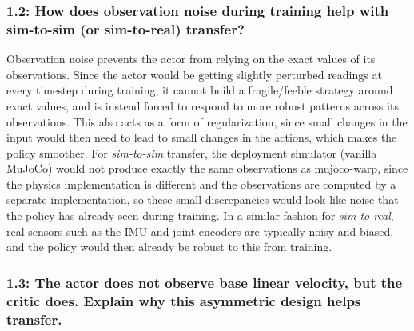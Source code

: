\documentclass[12pt]{article}
\begin{document}
\subsubsection*{1.2: How does observation noise during training help with sim-to-sim (or sim-to-real) transfer?}
\begin{solution}[height=7cm]
Observation noise prevents the actor from relying on the exact values of its observations. Since the actor would be getting slightly perturbed readings at every timestep during training, it cannot build a fragile/feeble strategy around exact values, and is instead forced to respond to more robust patterns across its observations. This also acts as a form of regularization, since small changes in the input would then need to lead to small changes in the actions, which makes the policy smoother. For \emph{sim-to-sim} transfer, the deployment simulator (vanilla MuJoCo) would not produce exactly the same observations as mujoco-warp, since the physics implementation is different and the observations are computed by a separate implementation, so these small discrepancies would look like noise that the policy has already seen during training. In a similar fashion for \emph{sim-to-real}, real sensors such as the IMU and joint encoders are typically noisy and biased, and the policy would then already be robust to this from training.
\end{solution}
\subsubsection*{1.3: The actor does not observe base linear velocity, but the critic does. Explain why this asymmetric design helps transfer.}
\begin{solution}[height=7cm, overlay unbroken and last={\node[anchor=north west, inner sep=0pt, text width=\tcbtextwidth, align=justify]
  at ([xshift=5mm, yshift=-3mm]interior.north west) {%
The critic is allowed to use privileged information (such as the base linear velocity) without any deployment cost since it is only used during training to compute value estimates (and not in deployment). With this extra (and per implementation, noise-free) information, the critic gets a more complete picture of the true robot state, which leads to more accurate value estimates and thus, lower-variance advantage estimates, which in turn give better gradients for the actor during PPO training. On the other hand, the actor only ever observes what is available from onboard sensors, so the network that actually gets deployed does not depend on anything it would not have at deployment. This avoids a train-test mismatch (similar to 1.1). In short, the privileged information is therefore used where it helps (training) and is kept away from where it is possibly unavailable / highly noisy (deployment), so we get the training benefits without the transfer costs.
};}]
\end{solution}
\end{document}

